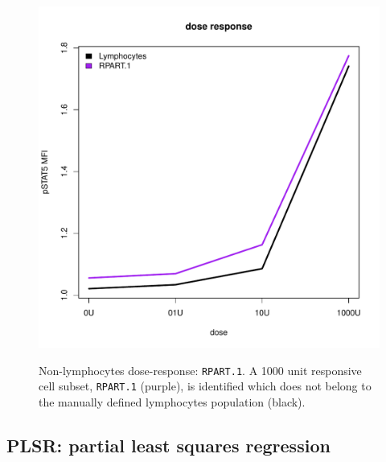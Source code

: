 \begin{figure}
\begin{minipage}{.9\textwidth}
{  %
}
\end{minipage}
%
\begin{minipage}{.5\textwidth}
\includegraphics[width=\linewidth]{figures/rpart-nonlymphocytes-dose-response}
\end{minipage}
\begin{minipage}{.3\textwidth}
{ Non-lymphocytes dose-response: \texttt{RPART.1}. }
{
    A 1000 unit responsive cell subset, \texttt{RPART.1} (purple), is identified which does not belong to the manually defined lymphocytes population (black).
}
\end{minipage}
\end{figure}




\clearpage


\subsection{PLSR: partial least squares regression}

